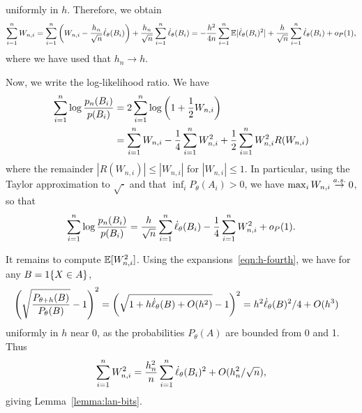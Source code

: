 uniformly in $h$.
Therefore, we obtain
\begin{equation*}
  \sum_{i = 1}^n W_{n,i}
  = \sum_{i = 1}^n \left(W_{n,i} - \frac{h_n}{\sqrt{n}} \dot{\ell}_\theta(B_i)\right)
  + \frac{h_n}{\sqrt{n}} \sum_{i = 1}^n \dot{\ell}_\theta(B_i)
  = -\frac{h^2}{4n} \sum_{i = 1}^n \mathbb{E}[\dot{\ell}_\theta(B_i)^2]
  + \frac{h}{\sqrt{n}} \sum_{i = 1}^n \dot{\ell}_\theta(B_i)
  + o_P(1),
\end{equation*}
where we have used that $h_n \to h$.

Now, we write the log-likelihood ratio. We have
\begin{align*}
  \sum_{i = 1}^n \log \frac{p_n(B_i)}{p(B_i)}
  & = 2 \sum_{i = 1}^n \log\left(1 + \frac{1}{2} W_{n,i}\right) \\
  & = \sum_{i = 1}^n W_{n,i}
  - \frac{1}{4} \sum_{i = 1}^n W_{n,i}^2
  + \frac{1}{2} \sum_{i = 1}^n W_{n,i}^2 R(W_{n,i})
\end{align*}
where the remainder $|R(W_{n,i})| \le |W_{n,i}|$ for $|W_{n,i}| \le 1$.
In particular, using the Taylor approximation to $\sqrt{\cdot}$ and
that $\inf_i P_\theta(A_i) > 0$, we have
$\max_i W_{n,i} \stackrel{a.s.}{\rightarrow} 0$, so that
\begin{equation}
  \label{eqn:almost-at-the-end}
  \sum_{i = 1}^n \log \frac{p_n(B_i)}{p(B_i)}
  = \frac{h}{\sqrt{n}} \sum_{i = 1}^n \dot{\ell}_\theta(B_i)
  - \frac{1}{4} \sum_{i = 1}^n W_{n,i}^2 + o_P(1).
\end{equation}

It remains to compute $\mathbb{E}[W_{n,i}^2]$. Using the
expansions~\eqref{eqn:h-fourth}, we have for any $B = 1\!\left\{X \in A\right\}$,
\begin{align*}
  \left(\sqrt{\frac{P_{\theta + h}(B)}{P_\theta(B)}}
  - 1\right)^2
  & = \left(\sqrt{1 + h \dot{\ell}_\theta(B) + O(h^2)} - 1\right)^2
  = h^2 \dot{\ell}_\theta(B)^2 / 4 + O(h^3)
\end{align*}
uniformly in $h$ near 0, as the probabilities $P_\theta(A)$ are bounded from
0 and 1. Thus
\begin{equation*}
  \sum_{i = 1}^n W_{n,i}^2
  = \frac{h_n^2}{n} \sum_{i = 1}^n \dot{\ell}_\theta(B_i)^2
  + O(h_n^2 / \sqrt{n}),
\end{equation*}
giving Lemma~\ref{lemma:lan-bits}.

